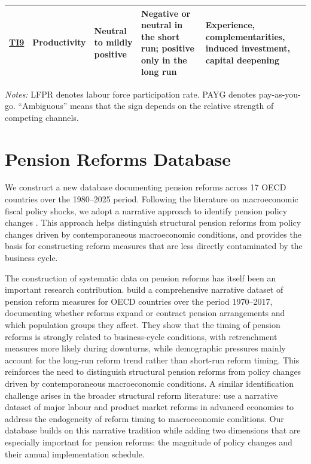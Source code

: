 \documentclass[11pt,english,a4paper, twoside, authoryear]{article}
\begin{document}
\begin{table}[H]
\begin{singlespace}
\begin{tabularx}{\textwidth}{p{1.1cm}p{3.2cm}p{2.7cm}p{3.2cm}X}
\hyperref[test:prod]{TI9} 
& Productivity
& Neutral to mildly positive
& Negative or neutral in the short run; positive only in the long run
& Experience, complementarities, induced investment, capital deepening \\

\bottomrule
\end{tabularx}

\vspace{0.15cm}
\footnotesize
\emph{Notes:} LFPR denotes labour force participation rate. PAYG denotes pay-as-you-go. ``Ambiguous'' means that the sign depends on the relative strength of competing channels.
\end{singlespace}
\end{table}


\section{Pension Reforms Database}\label{sec:data}

We construct a new database documenting pension reforms across 17 OECD countries over the 1980--2025 period. Following the literature on macroeconomic fiscal policy shocks, we adopt a narrative approach \citep{Ramey2009, RomerRomer2010} to identify pension policy changes \citep{Beetsma2020, BiZubairy2023, romp_political_2024}. This approach helps distinguish structural pension reforms from policy changes driven by contemporaneous macroeconomic conditions, and provides the basis for constructing reform measures that are less directly contaminated by the business cycle.


The construction of systematic data on pension reforms has itself been an important research contribution. \citet{Beetsma2020} build a comprehensive narrative dataset of pension reform measures for OECD countries over the period 1970--2017, documenting whether reforms expand or contract pension arrangements and which population groups they affect. They show that the timing of pension reforms is strongly related to business-cycle conditions, with retrenchment measures more likely during downturns, while demographic pressures mainly account for the long-run reform trend rather than short-run reform timing. This reinforces the need to distinguish structural pension reforms from policy changes driven by contemporaneous macroeconomic conditions. A similar identification challenge arises in the broader structural reform literature: \citet{DuvalFurceri2018} use a narrative dataset of major labour and product market reforms in advanced economies to address the endogeneity of reform timing to macroeconomic conditions. Our database builds on this narrative tradition while adding two dimensions that are especially important for pension reforms: the magnitude of policy changes and their annual implementation schedule.
\end{document}

